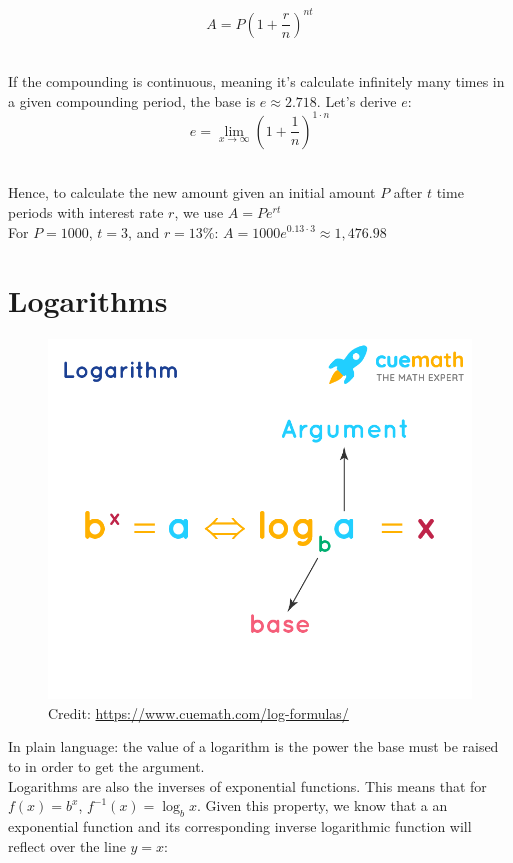 \documentclass[12pt]{article}
\begin{document}
\[A=P\left(1+\frac{r}{n}\right)^{nt}\]\

If the compounding is continuous, meaning it's calculate infinitely many times in a given compounding period, the base is \(e\approx2.718\). Let's derive \(e\):\\

\[e=\lim_{x\to \infty}\left(1+\frac{1}{n}\right)^{1\cdot n}\]\

Hence, to calculate the new amount given an initial amount \(P\) after \(t\) time periods with interest rate \(r\), we use \(A=Pe^{rt}\)\\

For \(P=1000\), \(t=3\), and \(r=13\%\): \(A=1000e^{0.13\cdot 3}\approx1,476.98\)\\

\section{Logarithms}

\begin{figure}[H]
	\centering
	\includegraphics[scale=0.6]{logs.png}
	\caption{Credit: \url{https://www.cuemath.com/log-formulas/}}
\end{figure}

In plain language: the value of a logarithm is the power the base must be raised to in order to get the argument.\\

Logarithms are also the inverses of exponential functions. This means that for \(f(x)=b^x\), \(f^{-1}(x)=\log_bx\). Given this property, we know that a an exponential function and its corresponding inverse logarithmic function will reflect over the line \(y=x\):\\
\end{document}
